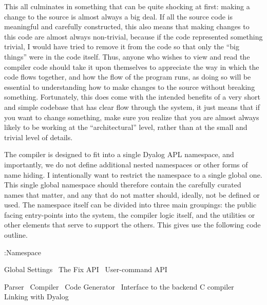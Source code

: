 \documentclass{article}%
\begin{document}
This all culminates in something that can be quite shocking at first:
making a change to the source is almost always a big deal.
If all the source code is meaningful and carefully constructed,
this also means that making changes to this code are almost always 
non-trivial, because if the code represented something trivial,
I would have tried to remove it from the code so that only the 
``big things'' were in the code itself.
Thus, anyone who wishes to view and read the compiler code should
take it upon themselves to appreciate the way in which the code flows
together,
and how the flow of the program runs, 
as doing so will be essential to understanding how to make changes to 
the source without breaking something.
Fortunately, this does come with the intended benefits of a very 
short and simple codebase that has clear flow through the system,
it just means that if you want to change something, 
make sure you realize that you are almost always likely to be working
at the ``architectural'' level, rather than at the small and trivial
level of details.

The compiler is designed to fit into a single Dyalog APL namespace,
and importantly, we do not define additional nested namespaces or 
other forms of name hiding. 
I intentionally want to restrict the namespace to a single global one.
This single global namespace should therefore contain the carefully 
curated names that matter, and any that do not matter should, ideally,
not be defined or used.
The namespace itself can be divided into three main groupings:
the public facing entry-points into the system,
the compiler logic itself,
and the utilities or other elements that serve to support the others.
This gives use the following code outline.

\nwenddocs{}\endmoddef\nwstartdeflinemarkup\nwenddeflinemarkup
:Namespace 

        \LA{}Global Settings~{\nwtagstyle{}}\RA{}
        \LA{}The Fix API~{\nwtagstyle{}}\RA{}
        \LA{}User-command API~{\nwtagstyle{}}\RA{}

        \LA{}Parser~{\nwtagstyle{}}\RA{}
        \LA{}Compiler~{\nwtagstyle{}}\RA{}
        \LA{}Code Generator~{\nwtagstyle{}}\RA{}
        \LA{}Interface to the backend C compiler~{\nwtagstyle{}}\RA{}
        \LA{}Linking with Dyalog~{\nwtagstyle{}}\RA{}
\end{document}

